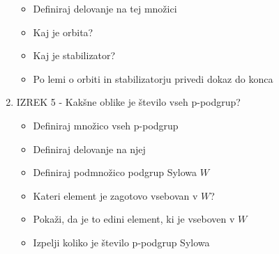 \documentclass{article}
\begin{document}
\begin{enumerate}
\begin{itemize}
             \item Definiraj delovanje na tej množici
             \item Kaj je orbita?
             \item Kaj je stabilizator?
             \item Po lemi o orbiti in stabilizatorju privedi dokaz do konca
         \end{itemize}
         \item IZREK 5 - Kakšne oblike je število vseh p-podgrup?
         \begin{itemize}
             \item Definiraj množico vseh p-podgrup
             \item Definiraj delovanje na njej
             \item Definiraj podmnožico podgrup Sylowa $W$
             \item Kateri element je zagotovo vsebovan v $W$?
             \item Pokaži, da je to edini element, ki je vseboven v $W$
             \item Izpelji koliko je število p-podgrup Sylowa 
         \end{itemize}
    \end{enumerate}
\end{document}
